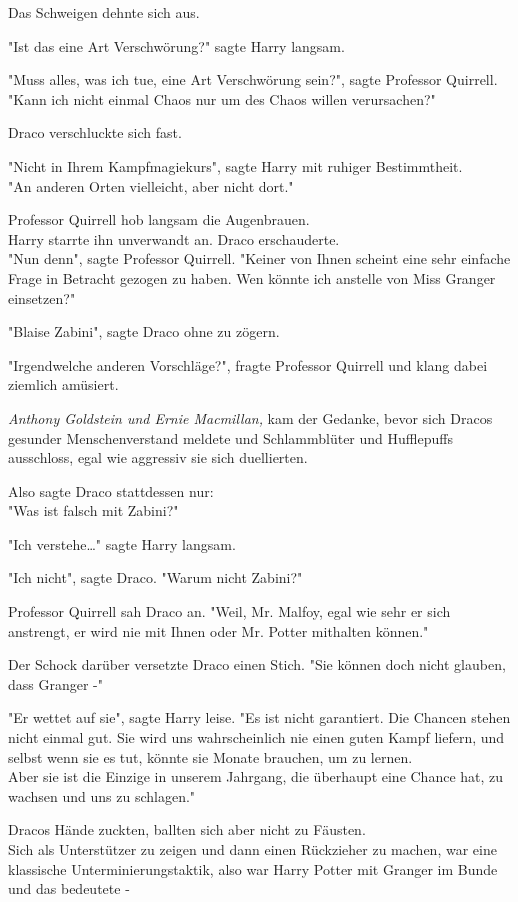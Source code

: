{Das Schweigen dehnte sich aus.

"Ist das eine Art Verschwörung?" sagte Harry langsam.

"Muss alles, was ich tue, eine Art Verschwörung sein?", sagte Professor Quirrell.\\ "Kann ich nicht einmal Chaos nur um des Chaos willen verursachen?"

Draco verschluckte sich fast.

"Nicht in Ihrem Kampfmagiekurs", sagte Harry mit ruhiger Bestimmtheit.\\ "An anderen Orten vielleicht, aber nicht dort."

Professor Quirrell hob langsam die Augenbrauen.\\ Harry starrte ihn unverwandt an. Draco erschauderte.\\ "Nun denn", sagte Professor Quirrell. "Keiner von Ihnen scheint eine sehr einfache Frage in Betracht gezogen zu haben. Wen könnte ich anstelle von Miss Granger einsetzen?"

"Blaise Zabini", sagte Draco ohne zu zögern.

"Irgendwelche anderen Vorschläge?", fragte Professor Quirrell und klang dabei ziemlich amüsiert.

\emph{Anthony Goldstein und Ernie Macmillan,} kam der Gedanke, bevor sich Dracos gesunder Menschenverstand meldete und Schlammblüter und Hufflepuffs ausschloss, egal wie aggressiv sie sich duellierten.

Also sagte Draco stattdessen nur:\\ "Was ist falsch mit Zabini?"

"Ich verstehe…" sagte Harry langsam.

"Ich nicht", sagte Draco. "Warum nicht Zabini?"

Professor Quirrell sah Draco an. "Weil, Mr. Malfoy, egal wie sehr er sich anstrengt, er wird nie mit Ihnen oder Mr. Potter mithalten können."

Der Schock darüber versetzte Draco einen Stich. "Sie können doch nicht glauben, dass Granger -"

"Er wettet auf sie", sagte Harry leise. "Es ist nicht garantiert. Die Chancen stehen nicht einmal gut. Sie wird uns wahrscheinlich nie einen guten Kampf liefern, und selbst wenn sie es tut, könnte sie Monate brauchen, um zu lernen.\\ Aber sie ist die Einzige in unserem Jahrgang, die überhaupt eine Chance hat, zu wachsen und uns zu schlagen."

Dracos Hände zuckten, ballten sich aber nicht zu Fäusten.\\ Sich als Unterstützer zu zeigen und dann einen Rückzieher zu machen, war eine klassische Unterminierungstaktik, also war Harry Potter mit Granger im Bunde und das bedeutete -

}
